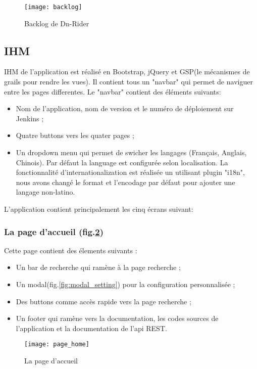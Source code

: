 \begin{figure}[ht]
 \centering
 \texttt{[image: backlog]}
 \caption{Backlog de Dn-Rider}
 \label{fig:backlog}
\end{figure}

\subsection{IHM}
IHM de l'application est réalisé en Bootstrap, jQuery et GSP(le mécanismes de grails pour rendre les vues).
Il contient tous un "navbar" qui permet de naviguer entre les pages differentes.
Le "navbar" contient des éléments suivants:
\begin{itemize}
 \item Nom de l'application, nom de version et le numéro de déploiement sur Jenkins ;
 \item Quatre buttons vers les quater pages ;
 \item Un dropdown menu qui permet de swicher les langages (Français, Anglais, Chinois).
       Par défaut la language est configurée selon localisation.
       La fonctionnalité d'internationalization est réalisée un utilisant plugin "i18n",
       nous avons changé le format et l'encodage par défaut pour ajouter une langage non-latino.
\end{itemize}

L'application contient principalement les cinq écrans suivant:

\subsubsection{La page d'accueil (fig.\ref{fig:page_home})}
Cette page contient des élements suivants :
\begin{itemize}
 \item Un bar de recherche qui ramène à la page recherche ;
 \item Un modal(fig.\ref{fig:modal_setting}) pour la configuration personnalisée ;
 \item Des buttons comme accès rapide vers la page recherche ;
 \item Un footer qui ramène vers la documentation, les codes sources de l'application et la documentation de l'api REST.
\end{itemize}

\begin{figure}[ht]
 \centering
 \texttt{[image: page\_home]}
 \caption{La page d'accueil}
 \label{fig:page_home}
\end{figure}


